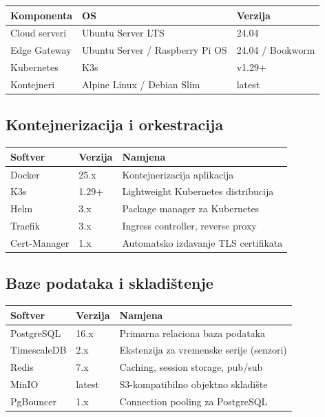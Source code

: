 \documentclass{article}
\begin{document}
\begin{center}
\begin{tabular}{|l|l|l|}
\hline
\rowcolor{lightgray}
\textbf{Komponenta} & \textbf{OS} & \textbf{Verzija} \\
\hline
Cloud serveri & Ubuntu Server LTS & 24.04 \\
\hline
Edge Gateway & Ubuntu Server / Raspberry Pi OS & 24.04 / Bookworm \\
\hline
Kubernetes & K3s & v1.29+ \\
\hline
Kontejneri & Alpine Linux / Debian Slim & latest \\
\hline
\end{tabular}
\end{center}

\subsection{Kontejnerizacija i orkestracija}

\begin{center}
\begin{tabular}{|l|l|l|}
\hline
\rowcolor{lightgray}
\textbf{Softver} & \textbf{Verzija} & \textbf{Namjena} \\
\hline
Docker & 25.x & Kontejnerizacija aplikacija \\
\hline
K3s & 1.29+ & Lightweight Kubernetes distribucija \\
\hline
Helm & 3.x & Package manager za Kubernetes \\
\hline
Traefik & 3.x & Ingress controller, reverse proxy \\
\hline
Cert-Manager & 1.x & Automatsko izdavanje TLS certifikata \\
\hline
\end{tabular}
\end{center}

\subsection{Baze podataka i skladištenje}

\begin{center}
\begin{tabular}{|l|l|l|}
\hline
\rowcolor{lightgray}
\textbf{Softver} & \textbf{Verzija} & \textbf{Namjena} \\
\hline
PostgreSQL & 16.x & Primarna relaciona baza podataka \\
\hline
TimescaleDB & 2.x & Ekstenzija za vremenske serije (senzori) \\
\hline
Redis & 7.x & Caching, session storage, pub/sub \\
\hline
MinIO & latest & S3-kompatibilno objektno skladište \\
\hline
PgBouncer & 1.x & Connection pooling za PostgreSQL \\
\hline
\end{tabular}
\end{center}
\end{document}
